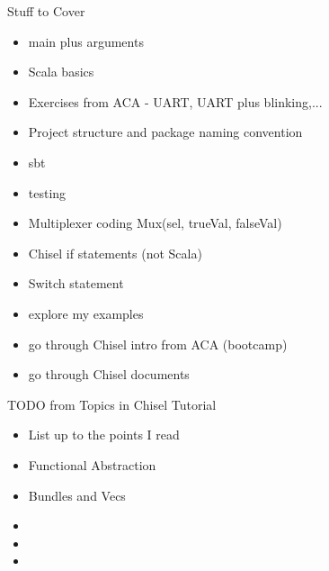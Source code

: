 \documentclass[xcolor=pdflatex,dvipsnames,table]{beamer}
\begin{document}
\begin{frame}[fragile]{Stuff to Cover}
\begin{itemize}
\item main plus arguments
\item Scala basics
\item Exercises from ACA - UART, UART plus blinking,...
\item Project structure and package naming convention
\item sbt
\item testing
\item Multiplexer coding Mux(sel, trueVal, falseVal)
\item Chisel if statements (not Scala)
\item Switch statement
\item explore my examples
\item go through Chisel intro from ACA (bootcamp)
\item go through Chisel documents
\end{itemize}
\end{frame}

\begin{frame}[fragile]{TODO from Topics in Chisel Tutorial}
\begin{itemize}
\item List up to the points I read
\item Functional Abstraction
\item Bundles and Vecs
\item 
\item 
\item 
\end{itemize}
\end{frame}
\end{document}
